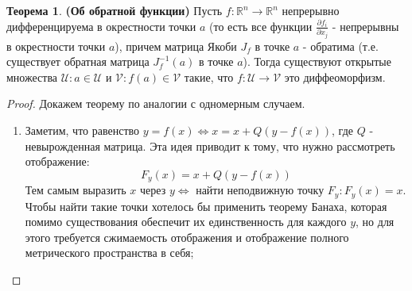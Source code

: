 \documentclass[12pt]{article}
\newcommand{\MR}{\mathbb{R}}
\newcommand{\MU}{\mathcal{U}}
\newcommand{\MV}{\mathcal{V}}
\theoremstyle{definition}
\newtheorem{theorem}{Теорема}
\begin{document}
\begin{theorem}\textbf{(Об обратной функции)} 
	Пусть $f \colon \MR^n \to \MR^n$ непрерывно дифференцируема в окрестности точки $a$ (то есть все функции $\tfrac{\partial f_i}{\partial x_j}$ - непрерывны в окрестности точки $a$), причем матрица Якоби $J_f$ в точке $a$ - обратима (т.е. существует обратная матрица $J_f^{-1}(a)$ в точке $a$). Тогда существуют открытые множества $\MU \colon a\in \MU$ и $\MV\colon f(a) \in \MV$ такие, что $f\colon \MU \to \MV$ это диффеоморфизм.
\end{theorem}
\begin{proof} Докажем теорему по аналогии с одномерным случаем.
	\begin{enumerate}[label ={(\arabic*)}]
		\item Заметим, что равенство $y = f(x) \Leftrightarrow x = x + Q(y - f(x))$, где $Q$ - невырожденная матрица. Эта идея приводит к тому, что нужно рассмотреть отображение: 
		$$
			F_y(x) = x + Q(y - f(x))
		$$ 
		Тем самым выразить $x$ через $y \Leftrightarrow$ найти неподвижную точку $F_y \colon F_y(x) = x$. Чтобы найти такие точки хотелось бы применить теорему Банаха, которая помимо существования обеспечит их единственность для каждого $y$, но для этого требуется сжимаемость отображения и отображение полного метрического пространства в себя;
		

\end{enumerate}
\end{proof}
\end{document}

